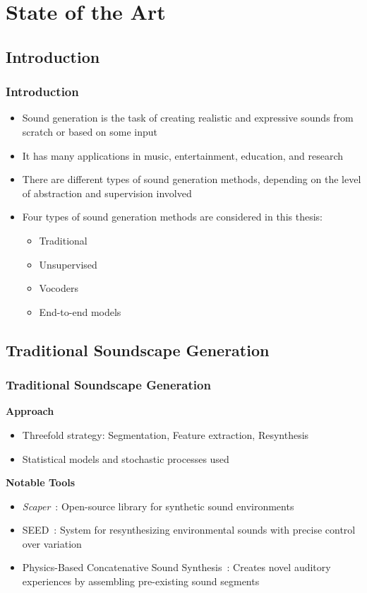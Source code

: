 \section{State of the Art}

\subsection{Introduction}
\begin{frame}
    \frametitle{Introduction}
    \begin{itemize}
        \item Sound generation is the task of creating realistic and expressive sounds from scratch or based on some input
        \item It has many applications in music, entertainment, education, and research
        \item There are different types of sound generation methods, depending on the level of abstraction and supervision involved
        \item Four types of sound generation methods are considered in this thesis:
              \begin{itemize}
                  \item Traditional
                  \item Unsupervised
                  \item Vocoders
                  \item End-to-end models
              \end{itemize}
    \end{itemize}
\end{frame}


\subsection{Traditional Soundscape Generation}

\begin{frame}
    \frametitle{Traditional Soundscape Generation}

    \textbf{Approach}
    \begin{itemize}
        \item Threefold strategy: Segmentation, Feature extraction, Resynthesis
        \item Statistical models and stochastic processes used
    \end{itemize}

    \textbf{Notable Tools}
    \begin{itemize}
        \item \textit{Scaper}~\cite{salamon_scaper_2017}: Open-source library for synthetic sound environments
        \item SEED~\cite{bernardes_seed_2016}: System for resynthesizing environmental sounds with precise control over variation
        \item Physics-Based Concatenative Sound Synthesis~\cite{magalhaes_physics-based_2020}: Creates novel auditory experiences by assembling pre-existing sound segments
    \end{itemize}
\end{frame}

